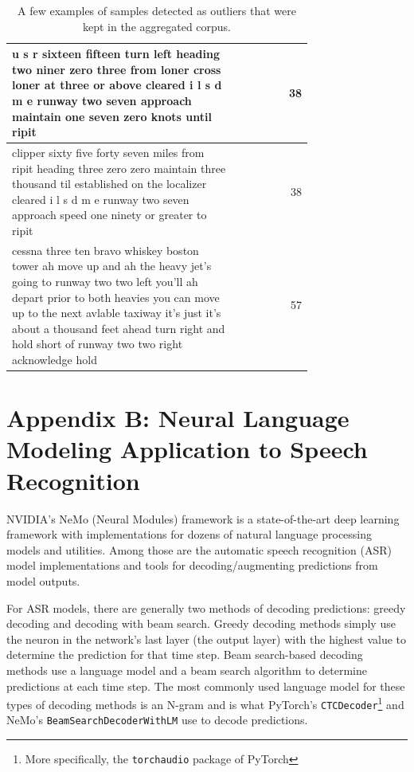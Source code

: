 \documentclass[12pt]{article}
\begin{document}
\begin{table}
\begin{tabular}{p{0.75\linewidth} r}
        \midrule
        u s r sixteen fifteen turn left heading two niner zero three from loner cross loner at three or above cleared i l s d m e runway two seven approach maintain one seven zero knots until ripit                                                                                                                               & 38              \\
        \midrule
        clipper sixty five forty seven miles from ripit heading three zero zero maintain three thousand til established on the localizer cleared i l s d m e runway two seven approach speed one ninety or greater to ripit                                                                                                         & 38              \\
        \midrule
        cessna three ten bravo whiskey boston tower ah move up and ah the heavy jet's going to runway two two left you'll ah depart prior to both heavies you can move up to the next avlable taxiway it's just it's about a thousand feet ahead turn right and hold short of runway two two right acknowledge hold                 & 57              \\
        \bottomrule
    \end{tabular}
    \caption{A few examples of samples detected as outliers that were kept in the aggregated corpus.}
    \label{tab:outlier_examples}
\end{table}

\newpage
\section{Appendix B: Neural Language Modeling Application to Speech Recognition}\label{sec:appendix_a}
NVIDIA's NeMo (Neural Modules) framework \cite{kuchaiev_nemo_2019} is a state-of-the-art deep learning framework with implementations for dozens of natural language processing models and utilities. Among those are the automatic speech recognition (ASR) model implementations and tools for decoding/augmenting predictions from model outputs.

For ASR models, there are generally two methods of decoding predictions: greedy decoding and decoding with beam search. Greedy decoding methods simply use the neuron in the network's last layer (the output layer) with the highest value to determine the prediction for that time step. Beam search-based decoding methods use a language model and a beam search algorithm to determine predictions at each time step. The most commonly used language model for these types of decoding methods is an N-gram and is what PyTorch's \lstinline|CTCDecoder|\footnote{More specifically, the \lstinline|torchaudio| package of PyTorch} \cite{paszke_pytorch_2019} and NeMo's \lstinline|BeamSearchDecoderWithLM| \cite{kuchaiev_nemo_2019} use to decode predictions.
\end{document}
